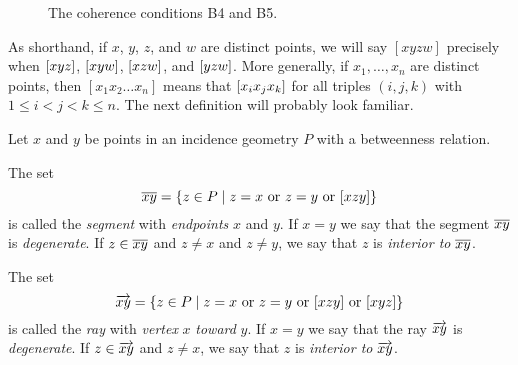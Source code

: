 \begin{figure}
\begin{center}
\caption{\label{fig:betweenness-coherence}The coherence conditions B4 and B5.}
\end{center}
\end{figure}

As shorthand, if \(x\), \(y\), \(z\), and \(w\) are distinct points, we will say \([xyzw]\) precisely when \([ x y z ]\), \([ x y w ]\), \([ x z w ]\), and \([ y z w ]\).
More generally, if \(x_1, \ldots, x_n\) are distinct points, then \([x_1x_2 \ldots x_n]\) means that \([ x_i x_j x_k ]\) for all triples \((i,j,k)\) with \(1 \leq i < j < k \leq n\).
The next definition will probably look familiar.

\begin{dfn}
Let \(x\) and \(y\) be points in an incidence geometry \(P\) with a betweenness relation.
\begin{proplist}
\item The set \[ \overline{xy} = \{ z \in P \mid z = x\ \mathrm{or}\ z = y\ \mathrm{or}\ [ x z y ] \} \] is called the \emph{segment} with \emph{endpoints} \(x\) and \(y\).
If \(x = y\) we say that the segment \(\overline{xy}\) is \emph{degenerate}.
If \(z \in \overline{xy}\) and \(z \neq x\) and \(z \neq y\), we say that \(z\) is \emph{interior to} \(\overline{xy}\).
\item The set \[ \RAY{x}{y} = \{ z \in P \mid z = x\ \mathrm{or}\ z = y\ \mathrm{or}\ \BETWEEN{x}{z}{y}\ \mathrm{or}\ \BETWEEN{x}{y}{z} \} \] is called the \emph{ray} with \emph{vertex} \(x\) \emph{toward} \(y\).
If \(x = y\) we say that the ray \(\overrightarrow{xy}\) is \emph{degenerate}.
If \(z \in \overrightarrow{xy}\) and \(z \neq x\), we say that \(z\) is \emph{interior to} \(\overrightarrow{xy}\).
\end{proplist}
\end{dfn}

